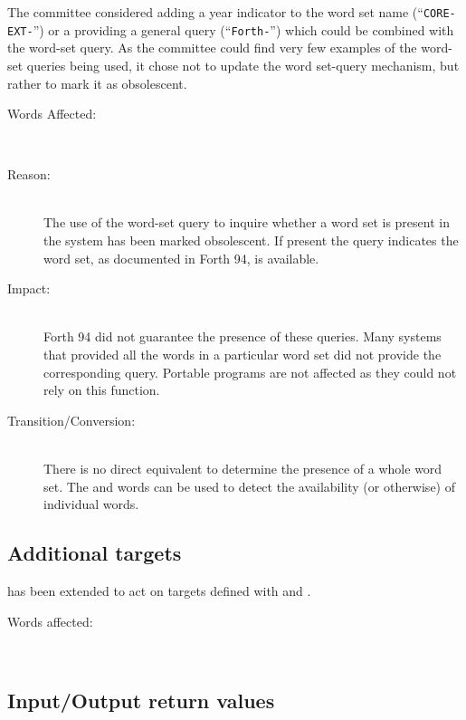 The committee considered adding a year indicator to the word set name
(``\texttt{CORE-EXT-\snapshot}'') or a providing a general query
(``\texttt{Forth-\snapshot}'') which could be combined with the
word-set query.  As the committee could find very few examples of the
word-set queries being used, it chose not to update the word set-query
mechanism, but rather to mark it as obsolescent.

\begin{description}
\item[Words Affected:] ~\\

\item[Reason:] ~\\
	The use of the word-set query to inquire whether a word set is
	present in the system has been marked obsolescent.  If present
	the query indicates the word set, as documented in Forth 94, is
	available.

\item[Impact:] ~\\
	Forth 94 did not guarantee the presence of these queries.  Many
	systems that provided all the words in a particular word set did
	not provide the corresponding query.  Portable programs are not
	affected as they could not rely on this function.

\item[Transition/Conversion:] ~\\
	There is no direct equivalent to determine the presence of a whole
	word set.  The  and 
	words can be used to detect the availability (or otherwise) of
	individual words.
\end{description}


\subsection[Additional TO targets]{Additional  targets} %
\label{diff:12:to}

 has been extended to act on targets defined with
 and .

\begin{description}
\item[Words affected:] ~\\
\end{description}


\subsection{Input/Output return values} %
\label{diff:12:ior}

